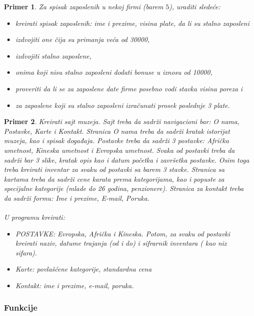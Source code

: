 \documentclass[a4paper]{article}
\newtheorem{primer}{Primer}[section]
\begin{document}
\begin{primer}
Za spisak zaposlenih u nekoj firmi (barem $5$), uraditi sledeće:
\begin{itemize}
	\item kreirati spisak zaposlenih: ime i prezime, visina plate, da li su stalno zaposleni
	\item izdvojiti one čija su primanja veća od 30000,
	\item izdvojiti stalno zaposlene,
	\item onima koji nisu stalno zaposleni dodati bonuse u iznosu od 10000,	
	\item proveriti da li se za zaposlene date firme posebno vodi stavka visina poreza i
	\item za zaposlene koji su stalno zaposleni izračunati prosek poslednje 3 plate.
\end{itemize}

\end{primer}

\begin{primer}
Kreirati sajt muzeja. Sajt treba da sadrži navigacioni bar: O nama, Postavke, Karte i Kontakt. Stranica O nama treba da sadrži kratak istorijat muzeja, kao i spisak događaja. Postavke treba da sadrži 3 postavke: Afrička umetnost, Kineska umetnost i Evropska umetnost. Svaka od postavki treba da sadrži bar 3 slike, kratak opis kao i datum početka i završetka postavke. Osim toga treba kreirati inventar za svaku od postavki sa barem 3 stavke. Stranica sa kartama treba da sadrži cene karata prema kategorijama, kao i popuste za specijalne kategorije (mlade do 26 godina, penzionere). Stranica za kontakt treba da sadrži formu: Ime i prezime, E-mail, Poruka.\\\\
U programu kreirati:
\begin{itemize}
\item POSTAVKE: Evropska, Afrička i Kineska. Potom, za svaku od postavki kreirati naziv, datume trajanja (od i do) i sifrarnik inventara ( kao niz sifara).
\item Karte: povlašćene kategorije, standardna cena
\item Kontakt: ime i prezime, e-mail, poruka.
\end{itemize}  
\end{primer}

\subsubsection{Funkcije}
\end{document}
